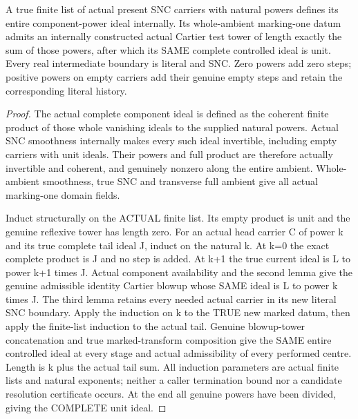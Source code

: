 \begin{theorem}
\label{hir:general-nc-completion-finite-actual-component-division}
\leanok
A true finite list of actual present SNC carriers with natural powers defines
its entire component-power ideal internally. Its whole-ambient marking-one
datum admits an internally constructed actual Cartier test tower of length
exactly the sum of those powers, after which its SAME complete controlled
ideal is unit. Every real intermediate boundary is literal and SNC. Zero
powers add zero steps; positive powers on empty carriers add their genuine
empty steps and retain the corresponding literal history.
\end{theorem}
\begin{proof}
The actual complete component ideal is defined as the coherent finite
product of those whole vanishing ideals to the supplied natural powers.
Actual SNC smoothness internally makes every such ideal invertible, including
empty carriers with unit ideals. Their powers and full product are therefore
actually invertible and coherent, and genuinely nonzero along the entire
ambient. Whole-ambient smoothness, true SNC and transverse full ambient give
all actual marking-one domain fields.

Induct structurally on the ACTUAL finite list. Its empty product is unit and
the genuine reflexive tower has length zero. For an actual head carrier C of
power k and its true complete tail ideal J, induct on the natural k. At k=0
the exact complete product is J and no step is added. At k+1 the true current
ideal is L to power k+1 times J. Actual component availability and the second
lemma give the genuine admissible identity Cartier blowup whose SAME ideal
is L to power k times J. The third lemma retains every needed actual carrier
in its new literal SNC boundary. Apply the induction on k to the TRUE new
marked datum, then apply the finite-list induction to the actual tail. Genuine
blowup-tower concatenation and true marked-transform composition give the
SAME entire controlled ideal at every stage and actual admissibility of every
performed centre. Length is k plus the actual tail sum. All induction
parameters are actual finite lists and natural exponents; neither a caller
termination bound nor a candidate resolution certificate occurs. At the end
all genuine powers have been divided, giving the COMPLETE unit ideal.
\end{proof}

